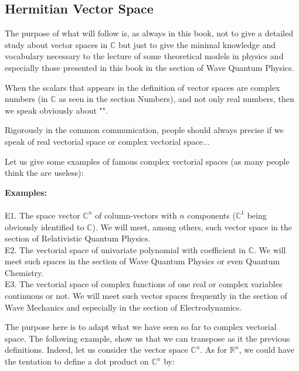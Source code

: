 	\pagebreak
	\subsection{Hermitian Vector Space}
	The purpose of what will follow is, as always in this book, not to give a detailed study about vector spaces in $\mathbb{C}$ but just to give the minimal knowledge and vocabulary necessary to the lecture of some theoretical models in physics and especially those presented in this book in the section of Wave Quantum Physics.
	
	When the scalars that appears in the definition of vector spaces are complex numbers (in $\mathbb{C}$ as seen in the section Numbers), and not only real numbers, then we speak obviously about "".
	
	\begin{tcolorbox}[title=Remark,colframe=black,arc=10pt]
	Rigorously in the common communication, people should always precise if we speak of real vectorial space or complex vectorial space...
	\end{tcolorbox}
	Let us give some examples of famous complex vectorial spaces (as many people think the are useless):

	\begin{tcolorbox}[colframe=black,colback=white,sharp corners]
	\textbf{{\Large {}}Examples:}\\\\
	E1. The space vector $\mathbb{C}^n$ of column-vectors with $n$ components ($\mathbb{C}^1$ being obviously identified to $\mathbb{C}$). We will meet, among others, such vector space in the section of Relativistic Quantum Physics.\\
	
	E2. The vectorial space of univariate polynomial with coefficient in $\mathbb{C}$. We will meet such spaces in the section of Wave Quantum Physics or even Quantum Chemistry.\\
	
	E3. The vectorial space of complex functions of one real or complex variables continuous or not. We will meet such vector spaces frequently in the section of Wave Mechanics and especially in the section of Electrodynamics.
	\end{tcolorbox}
	The purpose here is to adapt what we have seen so far to complex vectorial space. The following example, show us that we can transpose as it the previous definitions. Indeed, let us consider the vector space $\mathbb{C}^n$. As for $\mathbb{R}^n$, we could have the tentation to define a dot product on $\mathbb{C}^n$ by:
	

